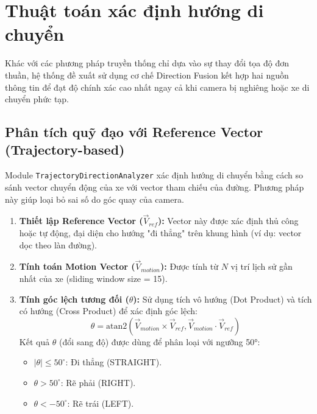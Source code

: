 \section{Thuật toán xác định hướng di chuyển}
\label{sec:direction_algo}

Khác với các phương pháp truyền thống chỉ dựa vào sự thay đổi tọa độ đơn thuần, hệ thống đề xuất sử dụng cơ chế Direction Fusion kết hợp hai nguồn thông tin để đạt độ chính xác cao nhất ngay cả khi camera bị nghiêng hoặc xe di chuyển phức tạp.

\subsection{Phân tích quỹ đạo với Reference Vector (Trajectory-based)}
Module \texttt{TrajectoryDirectionAnalyzer} xác định hướng di chuyển bằng cách so sánh vector chuyển động của xe với vector tham chiếu của đường. Phương pháp này giúp loại bỏ sai số do góc quay của camera.

\begin{enumerate}
    \item \textbf{Thiết lập Reference Vector ($\vec{V}_{ref}$):} Vector này được xác định thủ công hoặc tự động, đại diện cho hướng "đi thẳng" trên khung hình (ví dụ: vector dọc theo làn đường).
    
    \item \textbf{Tính toán Motion Vector ($\vec{V}_{motion}$):} Được tính từ $N$ vị trí lịch sử gần nhất của xe (sliding window size = 15).
    
    \item \textbf{Tính góc lệch tương đối ($\theta$):}
    Sử dụng tích vô hướng (Dot Product) và tích có hướng (Cross Product) để xác định góc lệch:
    \begin{equation}
        \theta = \text{atan2}(\vec{V}_{motion} \times \vec{V}_{ref}, \vec{V}_{motion} \cdot \vec{V}_{ref})
    \end{equation}
    Kết quả $\theta$ (đổi sang độ) được dùng để phân loại với ngưỡng 50°:
    \begin{itemize}
        \item $|\theta| \le 50^\circ$: Đi thẳng (STRAIGHT).
        \item $\theta > 50^\circ$: Rẽ phải (RIGHT).
        \item $\theta < -50^\circ$: Rẽ trái (LEFT).
    \end{itemize}
\end{enumerate}

